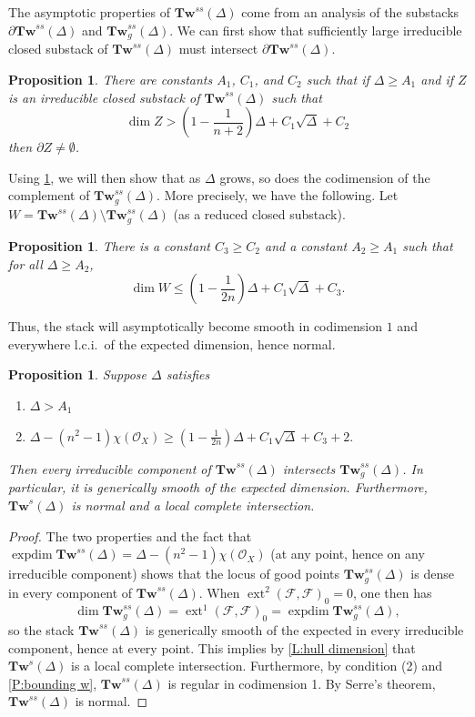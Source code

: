 \documentclass[11pt]{amsart}
\newcommand{\ms}[1]{\mathscr #1}
\DeclareMathOperator{\dimext}{ext}
\renewcommand{\[}{[\!\hspace{0.03em}[}
\renewcommand{\]}{]\!\hspace{0.03em}]}
\renewcommand{\(}{(\!\hspace{0.03em}(}
\renewcommand{\)}{)\!\hspace{0.03em})}
\newcommand{\Tw}{\mathbf{Tw}}
\DeclareMathOperator{\expdim}{exp dim}
\newtheorem{prop}[lem]{Proposition}
\theoremstyle{definition}
\theoremstyle{remark}
\begin{document}
The asymptotic properties of $\Tw^{ss}(\Delta)$ come from an analysis 
of the substacks $\partial\Tw^{ss}(\Delta)$ and 
$\Tw^{ss}_{g}(\Delta)$.  We can first show that sufficiently large 
irreducible closed substack of $\Tw^{ss}(\Delta)$ must intersect 
$\partial\Tw^{ss}(\Delta)$.

\begin{prop}\label{P:finding boundary points} There are constants 
$A_{1}$, $C_{1}$, and $C_{2}$ such that if $\Delta\geq A_{1}$ and if $Z$ is an irreducible 
closed substack of $\Tw^{ss}(\Delta)$ such that  
$$\dim Z>\left(1-\frac{1}{n+2}\right)\Delta +C_{1}\sqrt\Delta+C_{2}$$ 
then $\partial Z\neq\emptyset$.
\end{prop}

Using \ref{P:finding boundary points}, we will then show that as $\Delta$ grows, so does 
the codimension of the complement of $\Tw^{ss}_{g}(\Delta)$.  More 
precisely, we have the following.  Let 
$W=\Tw^{ss}(\Delta)\setminus\Tw^{ss}_{g}(\Delta)$ (as a reduced 
closed substack).

\begin{prop}\label{P:bounding w} There is a constant $C_{3}\geq C_{2}$ 
and a constant $A_{2}\geq A_{1}$ such that for all 
$\Delta\geq A_{2}$,
$$\dim W\leq\left(1-\frac{1}{2n}\right)\Delta+C_{1}\sqrt\Delta+C_{3}.$$
\end{prop}

Thus, the stack will asymptotically become smooth in codimension $1$ and everywhere 
l.c.i.\ of the expected dimension, hence normal.  

\begin{prop}\label{P:generic smoothness} Suppose $\Delta$ satisfies 
   \begin{enumerate}
       \item[(1)] $\Delta>A_{1}$
   
       \item[(2)] 
       $\Delta-(n^{2}-1)\chi({\ms O}_{X})\geq\left(1-\frac{1}{2n}\right)\Delta+C_{1}\sqrt\Delta+C_{3}+2.$
   \end{enumerate}
Then every irreducible component of $\Tw^{ss}(\Delta)$ intersects 
$\Tw^{ss}_{g}(\Delta)$.  In particular, it is generically smooth of 
the expected dimension.  Furthermore, $\Tw^{s}(\Delta)$ is normal and a local 
complete intersection.    
\end{prop}
\begin{proof} The two properties and the fact that 
$\expdim\Tw^{ss}(\Delta)=\Delta-(n^{2}-1)\chi({\ms O}_{X})$ (at any point, 
hence on any irreducible component) shows that the locus of good 
points $\Tw^{ss}_{g}(\Delta)$ is dense in every component of 
$\Tw^{ss}(\Delta)$.  When $\dimext^{2}(\ms F,\ms F)_{0}=0$, one then 
has $$\dim\Tw^{ss}_{g}(\Delta)=\dimext^{1}(\ms F,\ms F)_{0}=\expdim\Tw^{ss}_{g}(\Delta),$$ so 
the stack $\Tw^{ss}(\Delta)$ is generically smooth of the expected in 
every irreducible component, hence at every point.  This implies by 
\ref{L:hull dimension} that $\Tw^{s}(\Delta)$ is a local complete 
intersection.  Furthermore, by condition (2) and \ref{P:bounding 
w}, $\Tw^{ss}(\Delta)$ is regular in codimension 1.  By Serre's 
theorem, $\Tw^{ss}(\Delta)$ is normal.
\end{proof}
\end{document}
